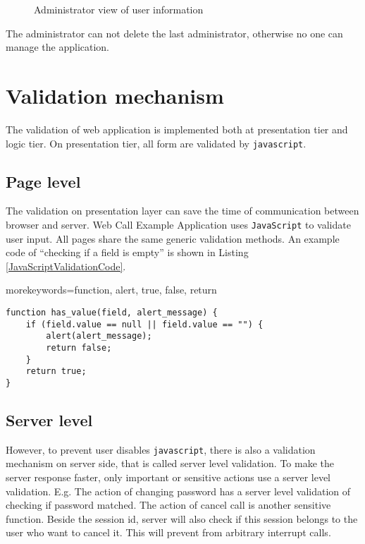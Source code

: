 \begin{figure}[!hbtp]
\centering
{}
\caption{Administrator view of user information}
\label{fig:AdministratorViewOfUserInformation}
\end{figure} 

The administrator can not delete the last administrator, otherwise no one can manage the application. 

\section{Validation mechanism}
\label{sec:WebApplication:ValidationMechanism}

The validation of web application is implemented both at presentation tier and logic tier. On presentation tier, all form are validated by \texttt{javascript}. 

\subsection{Page level}
\label{sec:WebApplication:ValidationMechanism:PageLevel}

The validation on presentation layer can save the time of communication between browser and server. Web Call Example Application uses \texttt{JavaScript} to validate user input. All pages share the same generic validation methods. An example code of ``checking if a field is empty'' is shown in Listing \ref{JavaScriptValidationCode}.

{morekeywords={function, alert, true, false, return}}
\lstset{language=Java}

\begin{lstlisting}[frame=lines, float=!bph, caption=JavaScript validation code, label=JavaScriptValidationCode]
function has_value(field, alert_message) {
    if (field.value == null || field.value == "") {
        alert(alert_message);
        return false;
    }
    return true;
}
\end{lstlisting}

\subsection{Server level}
\label{sec:WebApplication:ValidationMechanism:ServerLevel}

However, to prevent user disables \texttt{javascript}, there is also a validation mechanism on server side, that is called server level validation. To make the server response faster, only important or sensitive actions use a server level validation. E.g. The action of changing password has a server level validation of checking if password matched. The action of cancel call is another sensitive function. Beside the session id, server will also check if this session belongs to the user who want to cancel it. This will prevent from arbitrary interrupt calls.

